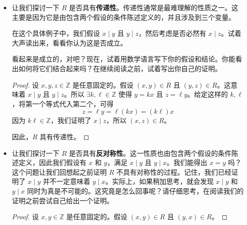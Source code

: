 \begin{example}
\begin{itemize}
        你可能会说：``$\frac{1}{k}$ 只有在 $k = 1$ 或 $k = -1$ 时才是整数，所以就是这样。''但这并不是完整的解释！要反驳一个``对于所有……''的命题，我们需要尽可能提供一个明确的反例。我们不需要全面描述该性质在所有情况下是否成立，只需要一个例子来证明这个性质不成立。这比含糊其辞地说某处可能存在反例要更直接明了。让我们展示一个反例给读者，然后再继续！
        \begin{proof}
            考虑 $2,6 \in \mathbb{Z}$，因为 $6=3 \cdot 2$，所以我们有 $(2,6) \in R$。

            然而，使 $2 = \ell \cdot 6$ 成立需要 $\ell = \frac{1}{3}$，而 $\frac{1}{3} \notin \mathbb{Z}$，因此 $(6,2) \notin R$。

            这证明了 $R$ 不具有\emph{对称性}。
        \end{proof}
        \item 让我们探讨一下 $R$ 是否具有\textbf{传递性}。传递性通常是最难理解的性质之一。这主要是因为它是由包含两个假设的条件陈述定义的，并且涉及到三个变量。

        在这个具体例子中，我们假设 $x \mid y$ 且 $y \mid z$，然后考虑是否必然有 $x \mid z$。试着大声读出来，看看你认为这是否成立。
        
        看起来是成立的，对吧？现在，试着用数学语言写下你的假设和结论。你能看出如何将它们结合起来吗？在继续阅读之前，试着写出你自己的证明。
        \begin{proof}
            设 $x, y, z \in \mathbb{Z}$ 是任意固定的。假设 $(x, y) \in R$ 且 $(y, z) \in R$。这意味着 $x \mid y$ 且 $y \mid z$。所以 $\exists k, \ell \in \mathbb{Z}$ 使得 $y = kx$ 且 $z = \ell y$。给定这样的 $k, \ell$，将第一个等式代入第二个，可得
            \[z = \ell y = \ell (kx) = (k \ell)x\]
            因为 $k \ell \in \mathbb{Z}$，我们证明了 $x \mid z$，所以 $(x, z) \in R$。

            因此，$R$ 具有传递性。
        \end{proof}
        \item 让我们探讨一下 $R$ 是否具有\textbf{反对称性}。这一性质也由包含两个假设的条件陈述定义，因此我们假设有 $x$ 和 $y$，满足 $x \mid y$ 且 $y \mid x$。我们能得出 $x = y$ 吗？这个问题让我们回想起之前证明 $R$ 不具有对称性的过程。记住，我们已经证明了 $x \mid y$ 并不一定意味着 $y \mid x$。实际上，如果稍加思考，就会发现 $x \mid y$ 和 $y \mid x$ 同时为真是不可能的。这究竟是怎么回事呢？请仔细思考，在阅读我们的证明之前尝试自己给出一个证明。
        \begin{proof}
            设 $x, y \in \mathbb{Z}$ 是任意固定的。假设 $(x, y) \in R$ 且 $(y,x) \in R$。


\end{proof}
\end{itemize}
\end{example}
